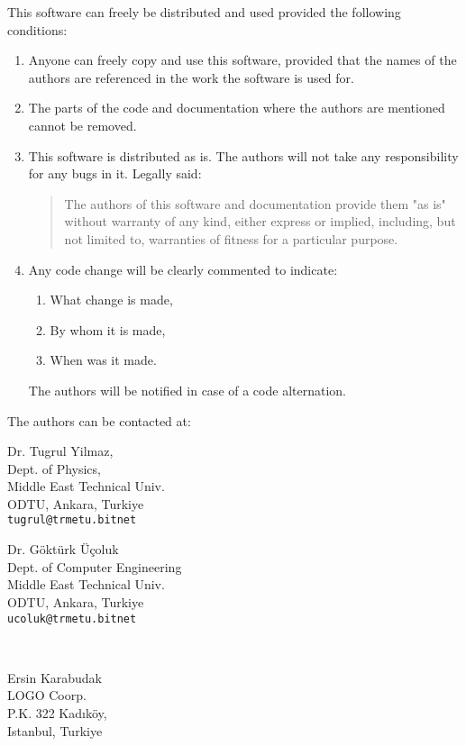This software can  freely  be distributed and  used
provided the following  conditions:
\begin{enumerate}
    \item
         Anyone can freely copy and use this software, provided that the
         names of  the  authors are  referenced in the work the software
         is used for.
    \item
         The parts of the code and documentation
          where the authors are mentioned
         cannot be removed.
    \item
         This software is distributed as is. The authors will not
         take any responsibility for any bugs in it. Legally said:
         \begin{quote}
          The authors of this software and documentation
             provide them "as is" without
            warranty of any kind, either express or implied, including,
            but not limited to, warranties of fitness for a
            particular purpose.
         \end{quote}
    \item
     Any code change will be clearly commented to indicate:
     \begin{enumerate}
          \item What change is made,
          \item By whom it is made,
          \item When was it made.
     \end{enumerate}
       The authors will be notified in case of a code alternation.
\end{enumerate}
\newpage
The authors can be contacted at:
\vspace*{2cm}
\begin{center}
\begin{minipage}[t]{5cm}
\noindent
Dr. Tugrul Yilmaz, \\
Dept. of Physics,  \\
Middle East Technical Univ. \\
ODTU, Ankara, Turkiye \\
{\tt tugrul@trmetu.bitnet}
\end{minipage}
\hspace*{2cm}
\begin{minipage}[t]{6cm}
\noindent
Dr. G\"{o}kt\"{u}rk \"{U}\c{c}oluk \\
Dept. of Computer Engineering \\
Middle East Technical Univ. \\
ODTU, Ankara, Turkiye     \\
{\tt ucoluk@trmetu.bitnet}
\end{minipage} \vspace*{15mm}\\
\begin{minipage}[t]{5cm}
\noindent
Ersin Karabudak \\
LOGO Coorp.\\
P.K. 322 Kad{\i}k\"{o}y, \\
Istanbul, Turkiye
\end{minipage}
\end{center}




